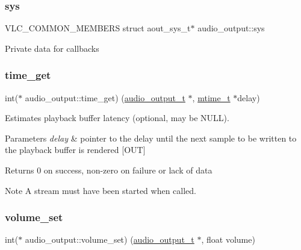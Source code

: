 \subsubsection{\texorpdfstring{sys}{sys}}
{\footnotesize\ttfamily V\+L\+C\+\_\+\+C\+O\+M\+M\+O\+N\+\_\+\+M\+E\+M\+B\+E\+RS struct aout\+\_\+sys\+\_\+t$\ast$ audio\+\_\+output\+::sys}

Private data for callbacks \mbox{\label{structaudio__output_a91330839cf46e7f8ef80dc61f5d490ad}} 
\subsubsection{\texorpdfstring{time\+\_\+get}{time\_get}}
{\footnotesize\ttfamily int($\ast$ audio\+\_\+output\+::time\+\_\+get) (\hyperlink{structaudio__output}{audio\+\_\+output\+\_\+t} $\ast$, \hyperlink{vlc__common_8h_a996e47c5ea061215703c26738351279e}{mtime\+\_\+t} $\ast$delay)}

Estimates playback buffer latency (optional, may be N\+U\+LL). 
\begin{DoxyParams}{Parameters}
{\em delay} & pointer to the delay until the next sample to be written to the playback buffer is rendered \mbox{[}O\+UT\mbox{]} \\
\hline
\end{DoxyParams}
\begin{DoxyReturn}{Returns}
0 on success, non-\/zero on failure or lack of data 
\end{DoxyReturn}
\begin{DoxyNote}{Note}
A stream must have been started when called. 
\end{DoxyNote}
\mbox{\label{structaudio__output_a38d3e01f0ae4d0a266510a7321b3a9f2}} 
\subsubsection{\texorpdfstring{volume\+\_\+set}{volume\_set}}
{\footnotesize\ttfamily int($\ast$ audio\+\_\+output\+::volume\+\_\+set) (\hyperlink{structaudio__output}{audio\+\_\+output\+\_\+t} $\ast$, float volume)}


